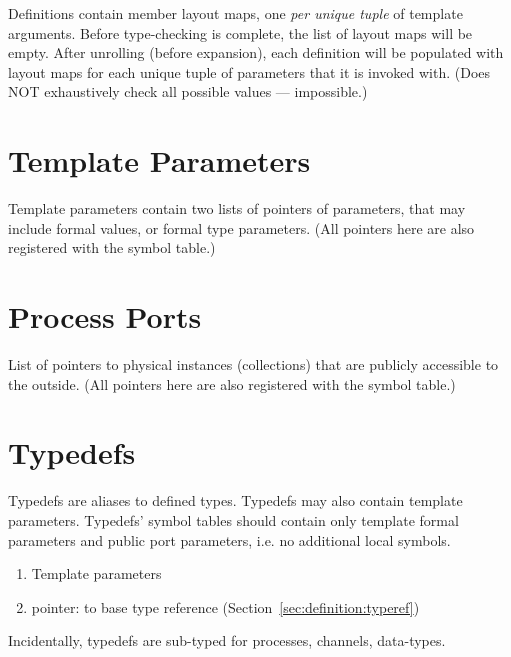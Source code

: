 Definitions contain member layout maps, 
one \emph{per unique tuple} of template arguments.  
Before type-checking is complete, the list of layout maps will be empty.  
After unrolling (before expansion), 
each definition will be populated with layout maps for each 
unique tuple of parameters that it is invoked with.  
(Does NOT exhaustively check all possible values --- impossible.)

\section{Template Parameters}
\label{sec:definition:template}

Template parameters contain two lists of pointers of parameters, 
that may include formal values, or formal type parameters.  
(All pointers here are also registered with the symbol table.)  

\section{Process Ports}
\label{sec:definition:ports}

List of pointers to physical instances (collections) that are publicly
accessible to the outside.  
(All pointers here are also registered with the symbol table.)  

\section{Typedefs}
\label{sec:definition:typedef}

Typedefs are aliases to defined types.  
Typedefs may also contain template parameters.  
Typedefs' symbol tables should contain only template formal parameters
	and public port parameters, i.e. no additional local symbols.  

\begin{enumerate}
\item Template parameters
\item pointer: to base type reference (Section~\ref{sec:definition:typeref})
\end{enumerate}

Incidentally, typedefs are sub-typed for processes, channels, data-types.  

